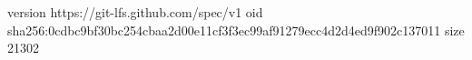 version https://git-lfs.github.com/spec/v1
oid sha256:0cdbc9bf30bc254cbaa2d00e11cf3f3ec99af91279ecc4d2d4ed9f902c137011
size 21302

